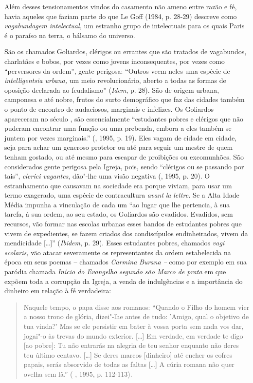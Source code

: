 Além desses tensionamentos vindos do casamento não ameno entre razão e
fé, havia aqueles que faziam parte do que Le Goff (1984, p. 28-29)
descreve como \emph{vagabundagem intelectual,} um estranho grupo de
intelectuais para os quais Paris é o paraíso na terra, o bálsamo do
universo.

São os chamados Goliardos, clérigos ou errantes que são tratados de
vagabundos, charlatães e bobos, por vezes como jovens inconsequentes,
por vezes como ``perversores da ordem'', gente perigosa: ``Outros veem
neles uma espécie de \emph{intelligentsia urbana,} um meio
revolucionário, aberto a todas as formas de oposição declarada ao
feudalismo'' (\emph{Idem}, p. 28). São de origem urbana, camponesa e até
nobre, frutos do surto demográfico que faz das cidades também o ponto de
encontro de audaciosos, marginais e infelizes. Os Goliardos apareceram
no século , são essencialmente ``estudantes pobres e clérigos que não
puderam encontrar uma função ou uma prebenda, embora a eles também se
juntem por vezes marginais.'' (, 1995, p. 19). Eles vagam de cidade
em cidade, seja para achar um generoso protetor ou até para seguir um
mestre de quem tenham gostado, ou até mesmo para escapar de proibições
ou excomunhões. São considerados gente perigosa pela Igreja, pois, sendo
``clérigos ou se passando por tais'', \emph{clerici vagantes}, dão"-lhe
uma visão negativa (, 1995, p. 20). O estranhamento que causavam na
sociedade era porque viviam, para usar um termo exagerado, uma espécie
de contracultura \emph{avant} \emph{la} \emph{lettre.} Se a Alta Idade
Média impunha a vinculação de cada um ``ao lugar que lhe pertencia, à
sua tarefa, à sua ordem, ao seu estado, os Goliardos são evadidos.
Evadidos, sem recursos, vão formar nas escolas urbanas esses bandos de
estudantes pobres que vivem de expedientes, se fazem criados dos
condiscípulos endinheirados, vivem da mendicidade [\ldots{}]''
(\emph{Ibidem}, p. 29). Esses estudantes pobres, chamados \emph{vagi
scolaris,} vão atacar severamente os representantes da ordem
estabelecida na época em seus poemas -- chamados \emph{Carmina}
\emph{Burana --} como por exemplo em sua paródia chamada \emph{Início do
Evangelho segundo são Marco de prata} em que expõem toda a corrupção da
Igreja, a venda de indulgências e a importância do dinheiro em relação à
fé verdadeira:

\begin{quote}
Naquele tempo, o papa disse aos romanos: ``Quando o Filho do homem vier
a nosso trono de glória, dizei"-lhe antes de tudo: 'Amigo, qual o
objetivo de tua vinda?' Mas se ele persistir em bater à vossa porta sem
nada vos dar, jogai"-o às trevas do mundo exterior. [\ldots{}] Em
verdade, em verdade te digo [ao pobre]: Tu não entrarás na alegria
de teu senhor enquanto não deres teu último centavo. [\ldots{}] Se
deres marcos [dinheiro] até encher os cofres papais, serás absorvido
de todas as faltas [\ldots{}] A cúria romana não quer ovelha sem
lã.'' ( , 1995, p. 112-113).
\end{quote}

